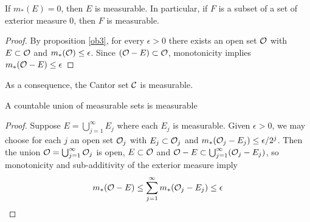 \documentclass[11pt]{article}
\begin{document}
\begin{proposition}[]
If \(m_*(E)=0\), then \(E\) is measurable. In particular, if \(F\) is a subset of a
set of exterior measure 0, then \(F\) is measurable.
\end{proposition}
\begin{proof}
By proposition \ref{ob3}, for every \(\epsilon>0\) there exists an open set
\(\mathcal{O}\) with \(E\subset\mathcal{O}\) and \(m_*(\mathcal{O})\le\epsilon\). Since
\((\mathcal{O}-E)\subset\mathcal{O}\), monotonicity implies \(m_*(\mathcal{O}-E)\le\epsilon\)
\end{proof}

As a consequence, the Cantor set \(\mathcal{C}\) is measurable.

\begin{proposition}[]
\label{prop3}
A countable union of measurable sets is measurable
\end{proposition}

\begin{proof}
Suppose \(E=\bigcup_{j=1}^\infty E_j\) where each \(E_j\) is measurable. Given
\(\epsilon>0\), we may choose for each \(j\) an open set \(\mathcal{O}_j\) with
\(E_j\subset\mathcal{O}_j\) and \(m_*(\mathcal{O}_j-E_j)\le\epsilon/2^j\). Then the union 
\(\mathcal{O}=\bigcup_{j=1}^\infty\mathcal{O}_j\) is open, \(E\subset\mathcal{O}\) and 
\(\mathcal{O}-E\subset\bigcup_{j=1}^\infty(\mathcal{O}_j-E_j)\), so monotonicity and
sub-additivity of the exterior measure imply
\begin{equation*}
m_*(\mathcal{O}-E)\le \displaystyle\sum_{j=1}^\infty m_*(\mathcal{O}_j-E_j)\le\epsilon
\end{equation*}
\end{proof}
\end{document}
